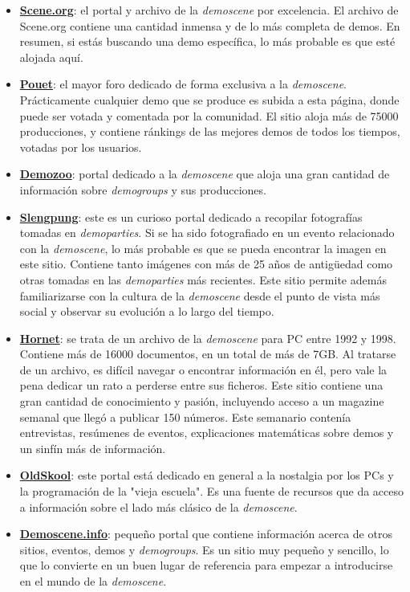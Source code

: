 \begin{itemize}
	\item \textbf{\href{https://www.scene.org}{Scene.org}}: el portal y archivo de la \emph{demoscene} por excelencia. El archivo de Scene.org contiene una cantidad inmensa y de lo más completa de demos. En resumen, si estás buscando una demo específica, lo más probable es que esté alojada aquí.
	\item \textbf{\href{http://www.pouet.net}{Pouet}}: el mayor foro dedicado de forma exclusiva a la \emph{demoscene}. Prácticamente cualquier demo que se produce es subida a esta página, donde puede ser votada y comentada por la comunidad. El sitio aloja más de 75000 producciones, y contiene ránkings de las mejores demos de todos los tiempos, votadas por los usuarios.
	\item \textbf{\href{https://demozoo.org}{Demozoo}}: portal dedicado a la \emph{demoscene} que aloja una gran cantidad de información sobre \emph{demogroups} y sus producciones.
	\item \textbf{\href{http://www.slengpung.com}{Slengpung}}: este es un curioso portal dedicado a recopilar fotografías tomadas en \emph{demoparties}. Si se ha sido fotografiado en un evento relacionado con la \emph{demoscene}, lo más probable es que se pueda encontrar la imagen en este sitio. Contiene tanto imágenes con más de 25 años de antigüedad como otras tomadas en las \emph{demoparties} más recientes. Este sitio permite además familiarizarse con la cultura de la \emph{demoscene} desde el punto de vista más social y observar su evolución a lo largo del tiempo.
	\item \textbf{\href{https://www.hornet.org}{Hornet}}: se trata de un archivo de la \emph{demoscene} para PC entre 1992 y 1998. Contiene más de 16000 documentos, en un total de más de 7GB. Al tratarse de un archivo, es difícil navegar o encontrar información en él, pero vale la pena dedicar un rato a perderse entre sus ficheros. Este sitio contiene una gran cantidad de conocimiento y pasión, incluyendo acceso a un magazine semanal que llegó a publicar 150 números. Este semanario contenía entrevistas, resúmenes de eventos, explicaciones matemáticas sobre demos y un sinfín más de información.
	\item \textbf{\href{http://www.oldskool.org}{OldSkool}}: este portal está dedicado en general a la nostalgia por los PCs y la programación de la "vieja escuela". Es una fuente de recursos que da acceso a información sobre el lado más clásico de la \emph{demoscene}.
	\item \textbf{\href{http://www.demoscene.info}{Demoscene.info}}: pequeño portal que contiene información acerca de otros sitios, eventos, demos y \emph{demogroups}. Es un sitio muy pequeño y sencillo, lo que lo convierte en un buen lugar de referencia para empezar a introducirse en el mundo de la \emph{demoscene}. 

\end{itemize}
